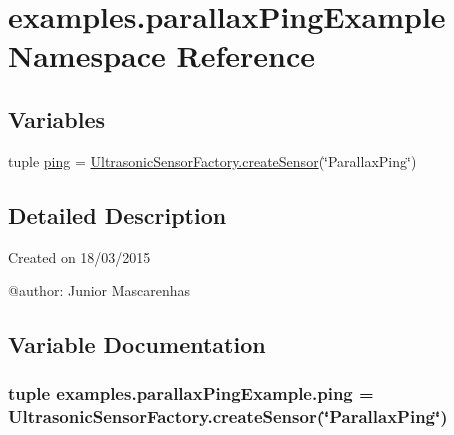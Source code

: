 \hypertarget{namespaceexamples_1_1parallaxPingExample}{}\section{examples.\+parallax\+Ping\+Example Namespace Reference}
\label{namespaceexamples_1_1parallaxPingExample}
\subsection*{Variables}
\begin{DoxyCompactItemize}
\item 
tuple \hyperlink{namespaceexamples_1_1parallaxPingExample_a4985eb3e4e74c154f1db607dac9234e4}{ping} = \hyperlink{classconcretefactory_1_1ultrasonicSensorFactory_1_1UltrasonicSensorFactory_ade21ba1ce348eb9e5cf8eee3fda4a773}{Ultrasonic\+Sensor\+Factory.\+create\+Sensor}(\char`\"{}Parallax\+Ping\char`\"{})
\end{DoxyCompactItemize}


\subsection{Detailed Description}
\begin{DoxyVerb}Created on 18/03/2015

@author: Junior Mascarenhas
\end{DoxyVerb}
 

\subsection{Variable Documentation}
\hypertarget{namespaceexamples_1_1parallaxPingExample_a4985eb3e4e74c154f1db607dac9234e4}{}
\subsubsection[{ping}]{\setlength{\rightskip}{0pt plus 5cm}tuple examples.\+parallax\+Ping\+Example.\+ping = {\bf Ultrasonic\+Sensor\+Factory.\+create\+Sensor}(\char`\"{}Parallax\+Ping\char`\"{})}\label{namespaceexamples_1_1parallaxPingExample_a4985eb3e4e74c154f1db607dac9234e4}
